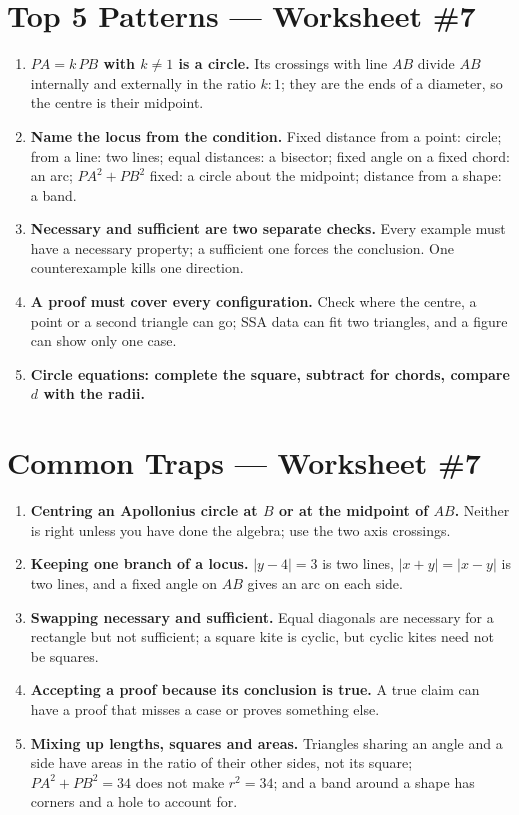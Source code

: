 \documentclass[11pt,a4paper]{article}
\begin{document}
\section*{Top 5 Patterns --- Worksheet \#7}
\begin{enumerate}[leftmargin=2em, itemsep=4pt]
  \item \textbf{$PA=k\,PB$ with $k\ne1$ is a circle.} Its crossings with line $AB$ divide $AB$ internally and externally in the ratio $k:1$; they are the ends of a diameter, so the centre is their midpoint. 
  \item \textbf{Name the locus from the condition.} Fixed distance from a point: circle; from a line: two lines; equal distances: a bisector; fixed angle on a fixed chord: an arc; $PA^2+PB^2$ fixed: a circle about the midpoint; distance from a shape: a band. 
  \item \textbf{Necessary and sufficient are two separate checks.} Every example must have a necessary property; a sufficient one forces the conclusion. One counterexample kills one direction. 
  \item \textbf{A proof must cover every configuration.} Check where the centre, a point or a second triangle can go; SSA data can fit two triangles, and a figure can show only one case. 
  \item \textbf{Circle equations: complete the square, subtract for chords, compare $d$ with the radii.} 
\end{enumerate}

\section*{Common Traps --- Worksheet \#7}
\begin{enumerate}[leftmargin=2em, itemsep=4pt]
  \item \textbf{Centring an Apollonius circle at $B$ or at the midpoint of $AB$.} Neither is right unless you have done the algebra; use the two axis crossings. 
  \item \textbf{Keeping one branch of a locus.} $|y-4|=3$ is two lines, $|x+y|=|x-y|$ is two lines, and a fixed angle on $AB$ gives an arc on each side. 
  \item \textbf{Swapping necessary and sufficient.} Equal diagonals are necessary for a rectangle but not sufficient; a square kite is cyclic, but cyclic kites need not be squares. 
  \item \textbf{Accepting a proof because its conclusion is true.} A true claim can have a proof that misses a case or proves something else. 
  \item \textbf{Mixing up lengths, squares and areas.} Triangles sharing an angle and a side have areas in the ratio of their other sides, not its square; $PA^2+PB^2=34$ does not make $r^2=34$; and a band around a shape has corners and a hole to account for. 
\end{enumerate}

\end{document}
